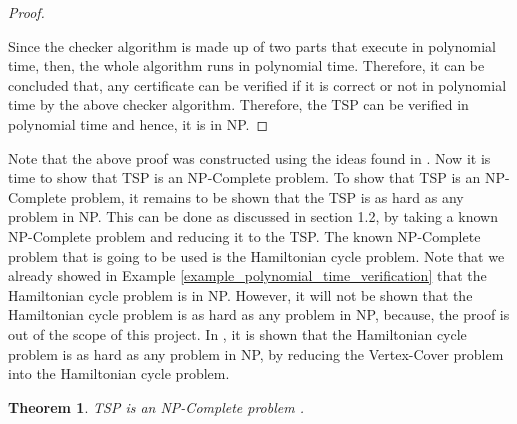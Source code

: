 \documentclass[12pt]{article}
\newtheorem{theorem}[definition]{Theorem}
\numberwithin{equation}{subsection}
\numberwithin{table}{subsection}
\begin{document}
\begin{proof}
\begin{itemize}
\end{itemize} 
Since the checker algorithm is made up of two parts that execute in polynomial time, then, the whole algorithm runs in polynomial time. Therefore, it can be concluded that, any certificate can be verified if it is correct or not in polynomial time by the above checker algorithm. Therefore, the TSP can be verified in polynomial time and hence, it is in NP. 
\end{proof}
Note that the above proof was constructed using the ideas found in \cite{cormen_leiserson_rivest_stein}. Now it is time to show that TSP is an NP-Complete problem.  To show that TSP is an NP-Complete problem, it remains to be shown that the TSP is as hard as any problem in NP. This can be done as discussed in section 1.2, by taking a known NP-Complete problem and reducing it to the TSP. The known NP-Complete problem that is going to be used is the Hamiltonian cycle problem. Note that we already showed in Example \ref{example_polynomial_time_verification} that the Hamiltonian cycle problem is in NP. However, it will not be shown that the Hamiltonian cycle problem is as hard as any problem in NP, because, the proof is out of the scope of this project. In \cite{cormen_leiserson_rivest_stein}, it is shown that the Hamiltonian cycle problem is as hard as any problem in NP, by reducing the Vertex-Cover problem into the Hamiltonian cycle problem.
\begin{theorem}
\label{TSP_NP-Complete}
TSP is an NP-Complete problem {}. 
\end{theorem}
\end{document}
